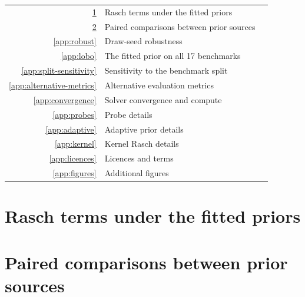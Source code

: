 \documentclass{article}
\begin{document}
\noindent\small\begin{tabular}{@{}rlr@{}}
\ref{app:ladder} & Rasch terms under the fitted priors & \pageref{app:ladder}\\
\ref{app:paired} & Paired comparisons between prior sources & \pageref{app:paired}\\
\ref{app:robust} & Draw-seed robustness & \pageref{app:robust}\\
\ref{app:lobo} & The fitted prior on all 17 benchmarks & \pageref{app:lobo}\\
\ref{app:split-sensitivity} & Sensitivity to the benchmark split & \pageref{app:split-sensitivity}\\
\ref{app:alternative-metrics} & Alternative evaluation metrics & \pageref{app:alternative-metrics}\\
\ref{app:convergence} & Solver convergence and compute & \pageref{app:convergence}\\
\ref{app:probes} & Probe details & \pageref{app:probes}\\
\ref{app:adaptive} & Adaptive prior details & \pageref{app:adaptive}\\
\ref{app:kernel} & Kernel Rasch details & \pageref{app:kernel}\\
\ref{app:licences} & Licences and terms & \pageref{app:licences}\\
\ref{app:figures} & Additional figures & \pageref{app:figures}\\
\end{tabular}
\normalsize\vspace{6pt}


\section{Rasch terms under the fitted priors}\label{app:ladder}
\begin{table}[H]
  \caption{$\Delta_{m-\mathrm{J}}$ for Rasch with terms switched off (prior width $\sigma$ set near zero), under the training-fitted priors. Competition-shaped draws on OOD validation and OOD test. Bold: lowest in each column.}
  \centering\small
  
\end{table}

\section{Paired comparisons between prior sources}\label{app:paired}
\begin{table}[H]
  \caption{Paired $\Delta_{a-b}$ between prior sources, with 95\% intervals over tasks. Each comparison changes sign between OOD test and OOD validation. A dash: not run on ID.}
  \centering\small\setlength{\tabcolsep}{4.5pt}
  
\end{table}
\end{document}
